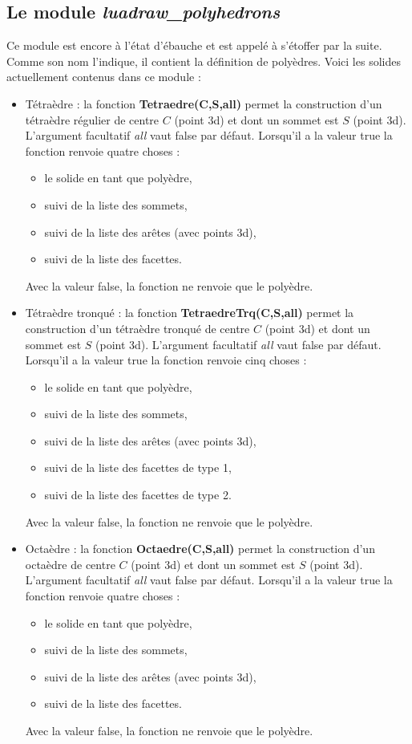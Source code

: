 \documentclass[%
10pt,%
a4paper,%
french,%
]%
{article}%
\begin{document}
\subsection{Le module \emph{luadraw\_polyhedrons}}

Ce module est encore à l'état d'ébauche et est appelé à s'étoffer par la suite. Comme son nom l'indique, il contient la définition de polyèdres. Voici les solides actuellement contenus dans ce module :

\begin{itemize}
    \item Tétraèdre : la fonction \textbf{Tetraedre(C,S,all)} permet la construction d'un tétraèdre régulier de centre $C$ (point 3d) et dont un sommet est $S$ (point 3d). L'argument facultatif \emph{all} vaut false par défaut. Lorsqu'il a la valeur true la fonction renvoie quatre choses :
    \begin{itemize}
        \item le solide en tant que polyèdre,
        \item suivi de la liste des sommets,
        \item suivi de la liste des arêtes (avec points 3d),
        \item suivi de la liste des facettes.
    \end{itemize}
Avec la valeur false, la fonction ne renvoie que le polyèdre.


\item Tétraèdre tronqué : la fonction \textbf{TetraedreTrq(C,S,all)} permet la construction d'un tétraèdre tronqué de centre $C$ (point 3d) et dont un sommet est $S$ (point 3d). L'argument facultatif \emph{all} vaut false par défaut. Lorsqu'il a la valeur true la fonction renvoie cinq choses :
    \begin{itemize}
        \item le solide en tant que polyèdre,
        \item suivi de la liste des sommets,
        \item suivi de la liste des arêtes (avec points 3d),
        \item suivi de la liste des facettes de type 1,
        \item suivi de la liste des facettes de type 2.
    \end{itemize}
Avec la valeur false, la fonction ne renvoie que le polyèdre.

\item Octaèdre : la fonction \textbf{Octaedre(C,S,all)} permet la construction d'un octaèdre de centre $C$ (point 3d) et dont un sommet est $S$ (point 3d). L'argument facultatif \emph{all} vaut false par défaut. Lorsqu'il a la valeur true la fonction renvoie quatre choses :
    \begin{itemize}
        \item le solide en tant que polyèdre,
        \item suivi de la liste des sommets,
        \item suivi de la liste des arêtes (avec points 3d),
        \item suivi de la liste des facettes.
    \end{itemize}
Avec la valeur false, la fonction ne renvoie que le polyèdre.


\end{itemize}
\end{document}
